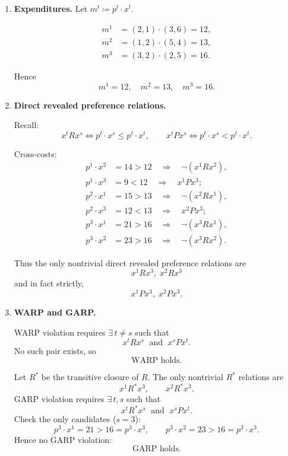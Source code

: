 \documentclass[12pt]{article}
\begin{document}
\begin{enumerate}[label=(\alph*)]
\item \textbf{Expenditures.} Let $m^t \coloneqq p^t\cdot x^t$.

\begin{align*}
m^1 &= (2,1)\cdot(3,6)=12,\\
m^2 &= (1,2)\cdot(5,4)=13,\\
m^3 &= (3,2)\cdot(2,5)=16.
\end{align*}

Hence
\[
\boxed{m^1=12,\quad m^2=13,\quad m^3=16.}
\]

\item \textbf{Direct revealed preference relations.}

Recall:
\[
x^t R x^s \iff p^t\cdot x^s \le p^t\cdot x^t,\qquad
x^t P x^s \iff p^t\cdot x^s < p^t\cdot x^t.
\]

Cross-costs:
\begin{align*}
p^1\cdot x^2 &= 14>12 \quad\Rightarrow\quad \neg(x^1 R x^2),\\
p^1\cdot x^3 &= 9<12 \quad\Rightarrow\quad x^1 P x^3;\\[0.25em]
p^2\cdot x^1 &= 15>13 \quad\Rightarrow\quad \neg(x^2 R x^1),\\
p^2\cdot x^3 &= 12<13 \quad\Rightarrow\quad x^2 P x^3;\\[0.25em]
p^3\cdot x^1 &= 21>16 \quad\Rightarrow\quad \neg(x^3 R x^1),\\
p^3\cdot x^2 &= 23>16 \quad\Rightarrow\quad \neg(x^3 R x^2).
\end{align*}

Thus the only nontrivial direct revealed preference relations are
\[
\boxed{x^1 R x^3,\;x^2 R x^3}
\]
and in fact strictly,
\[
\boxed{x^1 P x^3,\;x^2 P x^3.}
\]

\item \textbf{WARP and GARP.}

WARP violation requires $\exists\, t\neq s$ such that
\[
x^t R x^s \;\text{ and }\; x^s P x^t.
\]
No such pair exists, so
\[
\boxed{\text{WARP holds.}}
\]

Let $R^*$ be the transitive closure of $R$. The only nontrivial $R^*$ relations are
\[
x^1 R^* x^3,\qquad x^2 R^* x^3.
\]
GARP violation requires $\exists\, t,s$ such that
\[
x^t R^* x^s \;\text{ and }\; x^s P x^t.
\]
Check the only candidates ($s=3$):
\[
p^3\cdot x^1 = 21>16=p^3\cdot x^3,\qquad
p^3\cdot x^2 = 23>16=p^3\cdot x^3.
\]
Hence no GARP violation:
\[
\boxed{\text{GARP holds.}}
\]
\end{enumerate}
\end{document}
